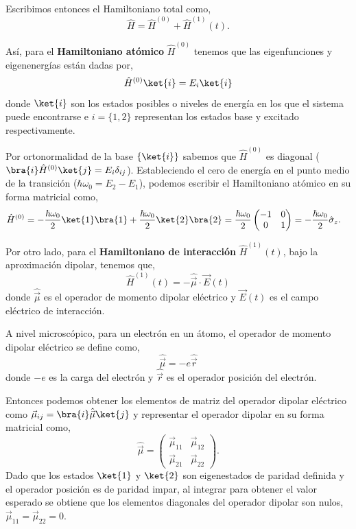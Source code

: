 Escribimos entonces el Hamiltoniano total como,
\begin{equation}
    \hat{H} = \hat{H}^{(0)} + \hat{H}^{(1)}(t).
\end{equation}

Así, para el \textbf{Hamiltoniano atómico} $\hat{H}^{(0)}$ tenemos que las eigenfunciones y eigenenergías están dadas por,
\begin{equation}
    \hat{H}^{(0)} \ket{i} = E_i \ket{i}
\end{equation}
donde $\ket{i}$ son los estados posibles o niveles de energía en los que el sistema puede encontrarse e
$i = \{1, 2\}$ representan los estados base y excitado respectivamente.

Por ortonormalidad de la base $\{\ket{i}\}$ sabemos que $\hat{H}^{(0)}$ es diagonal ($\bra{i} \hat{H}^{(0)} \ket{j} = E_i \delta_{ij}$). Estableciendo el cero de energía en el punto medio de la transición ($\hbar \omega_0 = E_2 - E_1$), podemos escribir el Hamiltoniano atómico en su forma matricial como,
\begin{equation}
\begin{split}    
    \hat{H}^{(0)} &= -\frac{\hbar \omega_0}{2} \ket{1}\bra{1} + \frac{\hbar \omega_0}{2} \ket{2}\bra{2}
    = \frac{\hbar \omega_0}{2} \begin{pmatrix}
    -1 & 0 \\
    0 & 1
    \end{pmatrix}
    = -\frac{\hbar \omega_0}{2} \hat{\sigma}_z.
\end{split}
\end{equation}

Por otro lado, para el \textbf{Hamiltoniano de interacción} $\hat{H}^{(1)}(t)$, bajo la aproximación dipolar, tenemos que,
\begin{equation}
    \hat{H}^{(1)}(t) = - \hat{\vec{\mu}} \cdot \vec{E}(t)
\end{equation}
donde $\hat{\vec{\mu}}$ es el operador de momento dipolar eléctrico y $\vec{E}(t)$ es el campo eléctrico de interacción.

A nivel microscópico, para un electrón en un átomo, el operador de momento dipolar eléctrico se define como,
\begin{equation}
    \hat{\vec{\mu}} = -e \hat{\vec{r}}
\end{equation}
donde $-e$ es la carga del electrón y $\hat{\vec{r}}$ es el operador posición del electrón.

Entonces podemos obtener los elementos de matriz del operador dipolar eléctrico como $\vec{\mu}_{ij} = \bra{i} \hat{\vec{\mu}} \ket{j}$ y representar el operador dipolar en su forma matricial como,
\begin{equation}
    \hat{\vec{\mu}} = \begin{pmatrix}
    \vec{\mu}_{11} & \vec{\mu}_{12} \\
    \vec{\mu}_{21} & \vec{\mu}_{22}
    \end{pmatrix}.
\end{equation}
Dado que los estados $\ket{1}$ y $\ket{2}$ son eigenestados de paridad definida y el operador posición es de paridad impar, al integrar para obtener el valor esperado se obtiene que los elementos diagonales del operador dipolar son nulos, $\vec{\mu}_{11} = \vec{\mu}_{22} = 0$.


